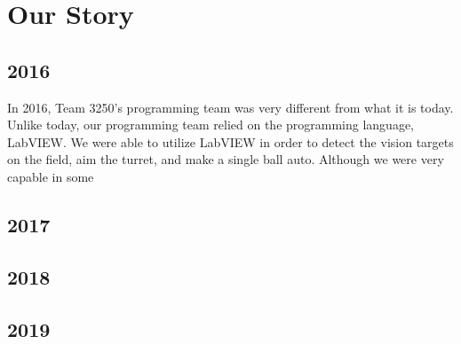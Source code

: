 \documentclass[../../main.tex]{subfiles}
\begin{document}
    \section{Our Story}
    \subsection{2016}
    In 2016, Team 3250's programming team was very different from what it is today. 
    Unlike today, our programming team relied on the programming language, LabVIEW.
    We were able to utilize LabVIEW in order to detect the vision targets on the field, aim the turret,
    and make a single ball auto.
    Although we were very capable in some 

    \subsection{2017}
    \subsection{2018}
    \subsection{2019}
\end{document}
